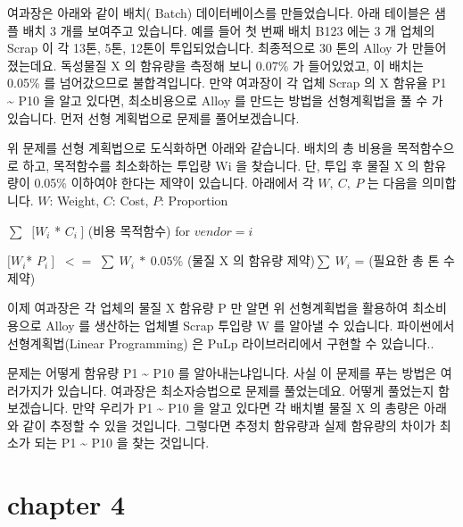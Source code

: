 \documentclass[letterpaper,10pt,english]{jupyterBook}
\begin{document}
\sphinxAtStartPar
여과장은 아래와 같이 배치( Batch) 데이터베이스를 만들었습니다. 아래 테이블은 샘플 배치 3 개를 보여주고 있습니다. 예를 들어 첫 번째 배치 B123 에는 3 개 업체의 Scrap 이 각 13톤, 5톤, 12톤이 투입되었습니다. 최종적으로 30 톤의 Alloy 가 만들어졌는데요. 독성물질 X 의 함유량을 측정해 보니 0.07\% 가 들어있었고, 이 배치는 0.05\% 를 넘어갔으므로 불합격입니다.  만약 여과장이 각 업체  Scrap 의 X 함유율 P1 \textasciitilde{} P10 을 알고 있다면, 최소비용으로 Alloy 를 만드는 방법을 선형계획법을 풀 수 가 있습니다. 먼저 선형 계획법으로 문제를 풀어보겠습니다.



\sphinxAtStartPar
위 문제를 선형 계획법으로 도식화하면 아래와 같습니다. 배치의 총 비용을 목적함수으로 하고, 목적함수를 최소화하는 투입량  Wi  을 찾습니다. 단, 투입 후 물질 X 의 함유량이 0.05\% 이하여야 한다는 제약이 있습니다.  아래에서 각 \( W,\ C,\ P \) 는  다음을 의미합니다.
\( W \): Weight, \( C \): Cost,  \( P \): Proportion

\sphinxAtStartPar
{} \( \sum\ \) \( [ W_i \) * \( C_i  \ ] \) (비용 목적함수) for \( vendor = i \)

\sphinxAtStartPar
{}

\sphinxAtStartPar
\( [ W_i \)* \( P_i  \ ] \) \(\ <= \) \(∑ \ W_i \ * \ 0.05\% \) (물질 X 의 함유량 제약)\( \sum\ W_i \)  =  (필요한 총 톤 수 제약)

\sphinxAtStartPar
이제 여과장은 각 업체의 물질 X 함유량 P 만 알면 위 선형계획법을 활용하여 최소비용으로 Alloy 를 생산하는 업체별 Scrap 투입량  W 를 알아낼 수 있습니다. 파이썬에서 선형계획법(Linear Programming) 은 PuLp 라이브러리에서 구현할 수 있습니다..

\sphinxAtStartPar
문제는 어떻게  함유량 P1 \textasciitilde{} P10 를 알아내는냐입니다. 사실 이 문제를 푸는 방법은 여러가지가 있습니다. 여과장은 최소자승법으로 문제를 풀었는데요. 어떻게 풀었는지 함 보겠습니다.  만약 우리가 P1 \textasciitilde{} P10 을 알고 있다면 각 배치별 물질 X 의 총량은 아래와 같이 추정할 수 있을 것입니다. 그렇다면 추정치 함유량과 실제 함유량의 차이가 최소가 되는 P1 \textasciitilde{} P10 을 찾는 것입니다.




\part{chapter 4}


\chapter{}
\label{\detokenize{chapter4/4.0.0_My_Strategy:id1}}\label{\detokenize{chapter4/4.0.0_My_Strategy::doc}}
\end{document}
